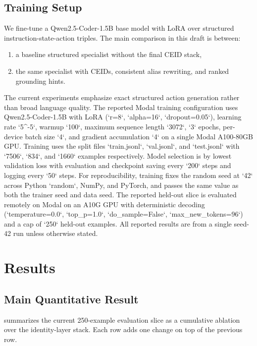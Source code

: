 \documentclass[11pt]{article}
\begin{document}
\subsection{Training Setup}
We fine-tune a Qwen2.5-Coder-1.5B base model with LoRA over structured instruction-state-action triples. The main comparison in this draft is between:
\begin{enumerate}[leftmargin=*,itemsep=0.25em]
  \item a baseline structured specialist without the final CEID stack,
  \item the same specialist with CEIDs, consistent alias rewriting, and ranked grounding hints.
\end{enumerate}

The current experiments emphasize exact structured action generation rather than broad language quality. The reported Modal training configuration uses Qwen2.5-Coder-1.5B with LoRA (`r=8`, `alpha=16`, `dropout=0.05`), learning rate `5^{-5}`, warmup `100`, maximum sequence length `3072`, `3` epochs, per-device batch size `4`, and gradient accumulation `4` on a single Modal A100-80GB GPU. Training uses the split files `train.jsonl`, `val.jsonl`, and `test.jsonl` with `7506`, `834`, and `1660` examples respectively. Model selection is by lowest validation loss with evaluation and checkpoint saving every `200` steps and logging every `50` steps. For reproducibility, training fixes the random seed at `42` across Python `random`, NumPy, and PyTorch, and passes the same value as both the trainer seed and data seed. The reported held-out slice is evaluated remotely on Modal on an A10G GPU with deterministic decoding (`temperature=0.0`, `top_p=1.0`, `do_sample=False`, `max_new_tokens=96`) and a cap of `250` held-out examples. All reported results are from a single seed-42 run unless otherwise stated.

\section{Results}
\subsection{Main Quantitative Result}
 summarizes the current 250-example evaluation slice as a cumulative ablation over the identity-layer stack. Each row adds one change on top of the previous row.
\end{document}
